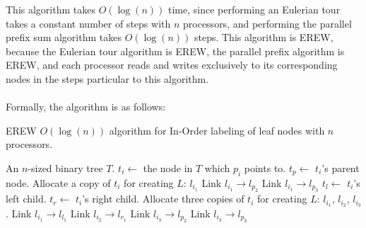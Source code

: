\documentclass[letterpaper,notitlepage,twoside]{article}
\begin{document}
This algorithm takes $O(\log(n))$ time, since performing an Eulerian tour takes a constant number of steps with $n$ processors, and performing the parallel prefix sum algorithm takes $O(\log(n))$ steps. This algorithm is EREW, because the Eulerian tour algorithm is EREW, the parallel prefix algorithm is EREW, and each processor reads and writes exclusively to its corresponding nodes in the steps particular to this algorithm.
\\\\
Formally, the algorithm is as follows:
\begin{algorithm}[H]
  \begin{algorithmic}%
    \caption{EREW $O(\log(n))$ algorithm for In-Order labeling of leaf nodes with $n$ processors.}
    \Require An $n$-sized binary tree $T$.
	\State $t_i \gets $ the node in $T$ which $p_i$ points to.
	\State $t_p \gets $ $t_i$'s parent node.
		\State Allocate a copy of $t_i$ for creating $L$: $l_{i_1}$
			\State Link $l_{i_1} \rightarrow l_{p_2}$
			\State Link $l_{i_1} \rightarrow l_{p_3}$
		\EndIf
	\Else
		\State $t_l \gets $ $t_i$'s left child.
		\State $t_r \gets $ $t_i$'s right child.
		\State Allocate three copies of $t_i$ for creating $L$: $l_{i_1}$, $l_{i_2}$, $l_{i_3}$.
		\State Link $l_{i_1} \rightarrow l_{l_1}$
		\State Link $l_{i_2} \rightarrow l_{r_1}$
			\State Link $l_{i_3} \rightarrow l_{p_2}$
			\State Link $l_{i_3} \rightarrow l_{p_3}$
		\EndIf
	\EndIf
  \end{algorithmic}
\end{algorithm}
\end{document}
